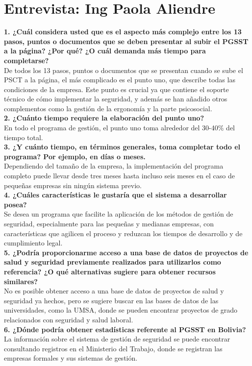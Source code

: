 \chapter{Entrevista: Ing Paola Aliendre}\label{sec:entrevista01}

\noindent
\textbf{1. ¿Cuál considera usted que es el aspecto más complejo entre los 13 pasos, puntos o documentos que se deben presentar al subir el PGSST a la página? ¿Por qué? ¿O cuál demanda más tiempo para completarse?}\\
De todos los 13 pasos, puntos o documentos que se presentan cuando se sube el PSCT a la página, el más complicado es el punto uno, que describe todas las condiciones de la empresa. Este punto es crucial ya que contiene el soporte técnico de cómo implementar la seguridad, y además se han añadido otros complementos como la gestión de la ergonomía y la parte psicosocial.
\\
\noindent
\textbf{2. ¿Cuánto tiempo requiere la elaboración del punto uno?}\\
En todo el programa de gestión, el punto uno toma alrededor del 30-40\% del tiempo total.
\\
\noindent
\textbf{3. ¿Y cuánto tiempo, en términos generales, toma completar todo el programa? Por ejemplo, en días o meses.}\\
Dependiendo del tamaño de la empresa, la implementación del programa completo puede llevar desde tres meses hasta incluso seis meses en el caso de pequeñas empresas sin ningún sistema previo.
\\
\noindent
\textbf{4. ¿Cuáles características le gustaría que el sistema a desarrollar posea?}\\
Se desea un programa que facilite la aplicación de los métodos de gestión de seguridad, especialmente para las pequeñas y medianas empresas, con características que agilicen el proceso y reduzcan los tiempos de desarrollo y de cumplimiento legal.
\\
\noindent
\textbf{5. ¿Podría proporcionarme acceso a una base de datos de proyectos de salud y seguridad previamente realizados para utilizarlos como referencia? ¿O qué alternativas sugiere para obtener recursos similares?}\\
No es posible obtener acceso a una base de datos de proyectos de salud y seguridad ya hechos, pero se sugiere buscar en las bases de datos de las universidades, como la UMSA, donde se pueden encontrar proyectos de grado relacionados con seguridad y salud laboral.
\\
\noindent
\textbf{6. ¿Dónde podría obtener estadísticas referente al PGSST en Bolivia?}\\
La información sobre el sistema de gestión de seguridad se puede encontrar consultando registros en el Ministerio del Trabajo, donde se registran las empresas formales y sus sistemas de gestión.
